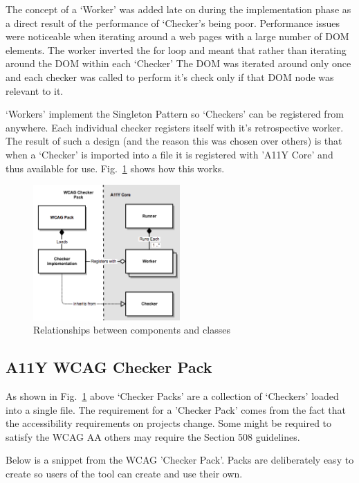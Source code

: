The concept of a `Worker' was added late on during the implementation phase as a
direct result of the performance of `Checker's being poor. Performance issues
were noticeable when iterating around a web pages with a large number of DOM
elements. The worker inverted the for loop and meant that
rather than iterating around the DOM within each `Checker' The DOM was
iterated around only once and each checker was called to perform it's check
only if that DOM node was relevant to it.

`Workers' implement the Singleton Pattern so `Checkers' can be registered from
anywhere. Each individual checker registers itself with it's retrospective
worker. The result of such a design (and the reason this was chosen over others)
is that when a `Checker' is imported into a file it is registered with 'A11Y
Core' and thus available for use. Fig.~\ref{fig:a11y_tool_worker_design}
shows how this works.

\begin{figure}[H]
\centering
\includegraphics[width=0.5\textwidth]{figures/a11y_tool_worker_design}
\captionsetup{justification=centering}
\caption{Relationships between components and classes
\label{fig:a11y_tool_worker_design}}
\end{figure}

\subsection{A11Y WCAG Checker Pack}
As shown in Fig.~\ref{fig:a11y_tool_worker_design} above `Checker Packs' are
a collection of `Checkers' loaded into a single file. The requirement for a
'Checker Pack' comes from the fact that the accessibility requirements on
projects change. Some might be required to satisfy the WCAG AA others may
require the Section 508 guidelines.

Below is a snippet from the WCAG 'Checker Pack'. Packs are deliberately easy to
create so users of the tool can create and use their own.

